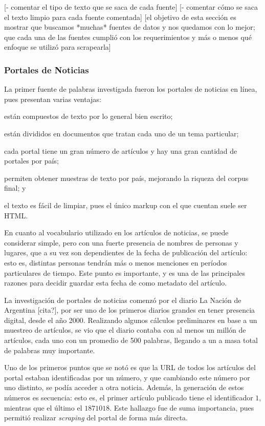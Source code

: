 [- comentar el tipo de texto que se saca de cada fuente]
[- comentar cómo se saca el texto limpio para cada fuente comentada]
[el objetivo de esta sección es mostrar que buscamos *muchas* fuentes de datos y nos quedamos con lo
mejor; que cada una de las fuentes cumplió con los requerimientos y más o menos qué enfoque se
utilizó para scrapearla]


\subsubsection{Portales de Noticias}

La primer fuente de palabras investigada fueron los portales de noticias en línea, pues presentan
varias ventajas:\begin{inparaenum}[(a)]
\item están compuestos de texto por lo general bien escrito;
\item están divididos en documentos que tratan cada uno de un tema particular;
\item cada portal tiene un gran número de artículos y hay una gran cantidad de portales por país;
\item permiten obtener muestras de texto por país, mejorando la riqueza del corpus final; y
\item el texto es fácil de limpiar, pues el único markup con el que cuentan suele ser HTML\@.
\end{inparaenum}

En cuanto al vocabulario utilizado en los artículos de noticias, se puede considerar simple, pero
con una fuerte presencia de nombres de personas y lugares, que a su vez son dependientes de la fecha
de publicación del artículo: esto es, distintas personas tendrán más o menos menciones en períodos
particulares de tiempo. Este punto es importante, y es una de las principales razones para decidir
guardar esta fecha de como metadato del artículo.


La investigación de portales de noticias comenzó por el diario La Nación de Argentina [cita?], por
ser uno de los primeros diarios grandes en tener presencia digital, desde el año 2000. Realizando
algunos cálculos preliminares en base a un muestreo de artículos, se vio que el diario contaba con
al menos un millón de artículos, cada uno con un promedio de 500 palabras, llegando a un a masa total
de palabras muy importante.

Uno de los primeros puntos que se notó es que la URL de todos los artículos del portal estaban
identificadas por un número, y que cambiando este número por uno distinto, se podía acceder a otra
noticia. Además, la generación de estos números es secuencia: esto es, el primer artículo publicado
tiene el identificador $1$, mientras que el último el $1871018$. Este hallazgo fue de suma
importancia, pues permitió realizar \textit{scraping} del portal de forma más directa.

